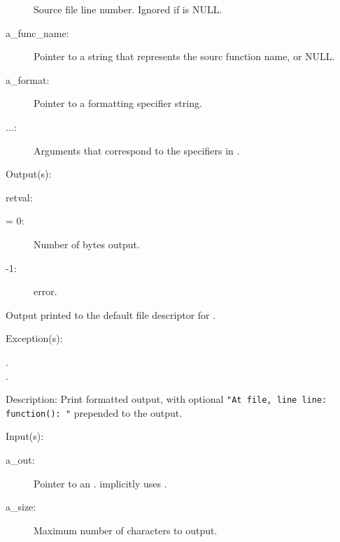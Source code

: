 \begin{capi}
\begin{capilist}
\begin{description}
			Source file line number.  Ignored if
			 is NULL.
		\item[a\_func\_name: ]
			Pointer to a string that represents the sourc function
			name, or NULL.
		\item[a\_format: ]
			Pointer to a formatting specifier string.
		\item[...: ]
			Arguments that correspond to the specifiers in
			.
		\end{description}
	\item[Output(s): ]
		\item[retval: ]
			\begin{description}\item[]
			\item[{\gt}= 0: ]
				Number of bytes output.
			\item[-1: ]
				 error.
			\end{description}
		\item{Output printed to the default file descriptor for
			.}
	\item[Exception(s): ]
		\begin{description}\item[]
		\item[.]
		\item[.]
		\end{description}
	\item[Description: ]
		Print formatted output, with optional {\tt "At {\lt}file{\gt},
		line {\lt}line{\gt}: {\lt}function{\gt}(): "} prepended to the
		output.
	\end{capilist}
\label{out_put_n}
\label{_cw_out_put_n}
	\begin{capilist}
	\item[Input(s): ]
		\begin{description}\item[]
		\item[a\_out: ]
			Pointer to an .
			 implicitly uses
			.
		\item[a\_size: ]
			Maximum number of characters to output.

\end{description}
\end{capilist}
\end{capi}
